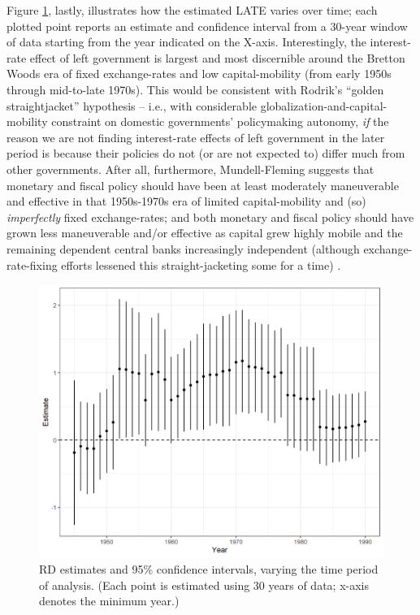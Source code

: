 \documentclass[12pt]{article}
\begin{document}
Figure \ref{fig:rdEstimateVaryingYear}, lastly, illustrates how the estimated LATE varies over time; each plotted point reports an estimate and confidence interval from a 30-year window of data starting from the year indicated on the X-axis. Interestingly, the interest-rate effect of left government is largest and most discernible around the Bretton Woods era of fixed exchange-rates and low capital-mobility (from early 1950s through mid-to-late 1970s). This would be consistent with Rodrik's ``golden straightjacket'' hypothesis -- i.e., with considerable globalization-and-capital-mobility constraint on domestic governments' policymaking autonomy, \textit{if} the reason we are not finding interest-rate effects of left government in the later period is because their policies do not (or are not expected to) differ much from other governments. After all, furthermore, Mundell-Fleming suggests that monetary and fiscal policy should have been at least moderately maneuverable and effective in that 1950s-1970s era of limited capital-mobility and (so) \textit{imperfectly} fixed exchange-rates; and both monetary and fiscal policy should have grown less maneuverable and/or effective as capital grew highly mobile and the remaining dependent central banks increasingly independent (although exchange-rate-fixing efforts lessened this straight-jacketing some for a time) \citep{Clark2003, Franzese2003}.

\begin{figure}
\centering
\includegraphics[width=\linewidth]{figures/Figure6.png}
\caption{RD estimates and 95\% confidence intervals, varying the time period of analysis. (Each point is estimated using 30 years of data; x-axis denotes the minimum year.)}
\label{fig:rdEstimateVaryingYear}
\end{figure}
\end{document}
